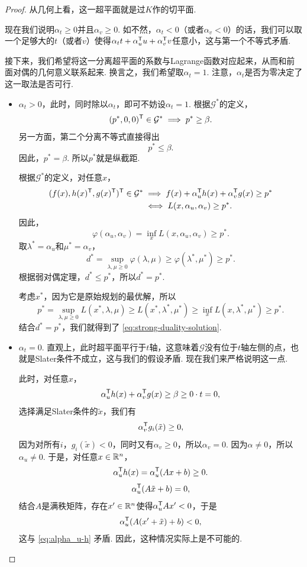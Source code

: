 \begin{proof}
    从几何上看，这一超平面就是过$K$作的切平面. 

    现在我们说明$\alpha_t\geq 0$并且$\alpha_v\geq 0$. 如不然，$\alpha_t<0$（或者$\alpha_v<0$）的话，我们可以取一个足够大的$t$（或者$v$）使得$\alpha_t t+\alpha_u^{\mathsf{T}} u+\alpha_v^{\mathsf{T}} v$任意小，这与第一个不等式矛盾.

    接下来，我们希望将这一分离超平面的系数与Lagrange函数对应起来，从而和前面对偶的几何意义联系起来. 换言之，我们希望取$\alpha_t=1$. 注意，$\alpha_t$是否为零决定了这一取法是否可行. 
    \begin{itemize}
        \item $\alpha_t>0$，此时，同时除以$\alpha_t$，即可不妨设$\alpha_t=1$. 根据$\mathcal G^*$的定义，
        \[(p^*,0,0)^{\mathsf{T}}\in\mathcal G^*\implies p^*\geq\beta.\]
        另一方面，第二个分离不等式直接得出
        \[p^*\leq\beta.\]
        因此，$p^*=\beta$. 所以$p^*$就是纵截距. 

        根据$\mathcal G^*$的定义，对任意$x$，
        \begin{align*}
            (f(x),h(x)^{\mathsf{T}},g(x)^{\mathsf{T}})^{\mathsf{T}}\in\mathcal G^*&\implies f(x)+\alpha_u^{\mathsf{T}} h(x)+\alpha_v^{\mathsf{T}} g(x)\geq p^*\\
            &\iff L(x,\alpha_u,\alpha_v)\geq p^*.
        \end{align*}
        因此，
        \[\varphi(\alpha_u,\alpha_v)=\inf_{x} L(x,\alpha_u,\alpha_v)\geq p^*.\]
        取$\lambda^*=\alpha_u$和$\mu^*=\alpha_v$，
        \[d^*=\sup_{\lambda,\mu\geq 0} \varphi(\lambda,\mu)\geq \varphi(\lambda^*,\mu^*)\geq p^*.\]
        根据弱对偶定理，$d^*\leq p^*$，所以$d^*=p^*$.

        考虑$x^*$，因为它是原始规划的最优解，所以
        \[p^*=\sup_{\lambda,\mu\geq 0} L(x^*,\lambda,\mu)\geq L(x^*,\lambda^*,\mu^*)\geq \inf_{x} L(x,\lambda^*,\mu^*)\geq p^*.\]
        结合$d^*=p^*$，我们就得到了 \eqref{eq:strong-duality-solution}.
        \item $\alpha_t=0$. 直观上，此时超平面平行于$t$轴，这意味着$\mathcal G$没有位于$t$轴左侧的点，也就是Slater条件不成立，这与我们的假设矛盾. 现在我们来严格说明这一点. 
        
        此时，对任意$x$，
        \[\alpha_u^{\mathsf{T}} h(x)+\alpha_v^{\mathsf{T}} g(x)\geq\beta\geq 0\cdot t=0,\]
        选择满足Slater条件的$\tilde{x}$，我们有
        \[\alpha_v^{\mathsf{T}} g_i(\tilde{x})\geq 0,\]
        因为对所有$i$，$g_i(\tilde{x})<0$，同时又有$\alpha_v\geq 0$，所以$\alpha_v=0$. 因为$\alpha\neq 0$，所以$\alpha_u\neq 0$. 于是，对任意$x\in\mathbb{R}^n$，
        \begin{equation}
            \alpha_u^{\mathsf{T}} h(x)=\alpha_u^{\mathsf{T}}(Ax+b)\geq 0. \label{eq:alpha_u-h}
        \end{equation}
        \[\alpha_u^{\mathsf{T}} (A\tilde{x}+b)=0,\]
        结合$A$是满秩矩阵，存在$x'\in\mathbb{R}^n$使得$\alpha_u^{\mathsf{T}} Ax'<0$，于是
        \[\alpha_u^{\mathsf{T}} (A(x'+\tilde{x})+b)<0,\]
        这与 \eqref{eq:alpha_u-h} 矛盾. 因此，这种情况实际上是不可能的.
    \end{itemize}
\end{proof}

